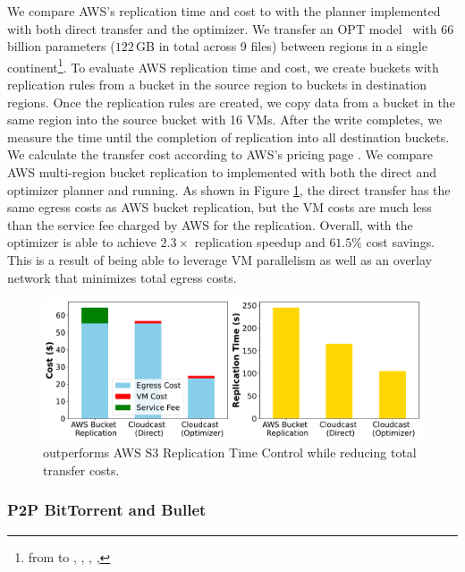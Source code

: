 We compare AWS's replication time and cost to \sys{} with the planner implemented with both direct transfer and the optimizer. 
We transfer an OPT model~\cite{zhang2022opt} with 66 billion parameters ($122$\,GB in total across 9 files) between regions in a single continent\footnote{from  to , , , , }.
To evaluate AWS replication time and cost, we create buckets with replication rules from a bucket in the source region to buckets in destination regions. 
Once the replication rules are created, we copy data from a bucket in the same region into the source bucket with 16 VMs. After the write completes, we measure the time until the completion of replication into all destination buckets. We calculate the transfer cost according to AWS's pricing page \cite{aws-data-transfer-cost}. We compare AWS multi-region bucket replication to \sys{} implemented with both the direct and optimizer planner and running.  As shown in Figure \ref{fig:aws_comparison}, the direct transfer has the same egress costs as AWS bucket replication, but the VM costs are much less than the service fee charged by AWS for the replication. Overall, \sys{} with the optimizer is able to achieve $2.3\times$ replication speedup and $61.5\%$ cost savings. This is a result of being able to leverage VM parallelism as well as an overlay network that minimizes total egress costs.  

\begin{figure}[t]
    \centering
    \includegraphics[width=
    \linewidth]{figures/opt_e2e.pdf}
    \caption{\sys{} outperforms AWS S3 Replication Time Control while reducing total transfer costs.} 
    \label{fig:aws_comparison}
\end{figure}

\subsubsection{P2P BitTorrent and Bullet}

